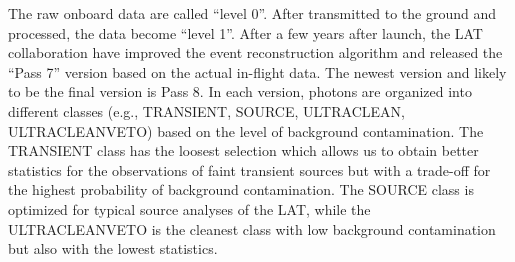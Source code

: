 
The raw onboard data are called ``level 0''. After transmitted 
to the ground and processed, the data become ``level 1''.
After a few years after launch, the LAT collaboration have
improved the event reconstruction algorithm and released
the ``Pass 7'' version based on the actual in-flight data.
The newest version 
and likely to be the final version is Pass 8.
In each version, photons are organized into different classes
(e.g., TRANSIENT, SOURCE, ULTRACLEAN, ULTRACLEANVETO)
based on the level of background contamination.
The TRANSIENT class has the loosest selection which allows us
to obtain better statistics for the observations of faint
transient sources but with a trade-off for the highest
probability of background contamination.
The SOURCE class is optimized for typical source
analyses of the LAT, while the ULTRACLEANVETO is the
cleanest class with low background contamination but
also with the lowest statistics.



